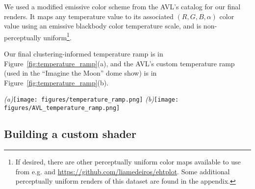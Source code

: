 \documentclass[fleqn,usenatbib,useAMS]{mnras}
\begin{document}
We used a modified emissive color scheme from the AVL's catalog for our final renders. It maps any temperature value to its associated $(R,G,B, \alpha)$ color value using an emissive blackbody color temperature scale, and is non-perceptually uniform\footnote{If desired, there are other perceptually uniform color maps available to use from e.g. \cite{Moreland16} and \url{https://github.com/liamedeiros/ehtplot}. Some additional perceptually uniform renders of this dataset are found in the appendix.}. \par

Our final clustering-informed temperature ramp is in Figure~\ref{fig:temperature_ramp}(a), and the AVL's custom temperature ramp (used in the ``Imagine the Moon'' dome show) is in Figure~\ref{fig:temperature_ramp}(b). \par
%
\begin{figure*}
 \begin{minipage}[c]{1.0\linewidth}
  \centering
  \begin{center}
  \textit{(a)}\texttt{[image: figures/temperature\_ramp.png]}
  \textit{(b)}\texttt{[image: figures/AVL\_temperature\_ramp.png]}
  \caption{\textit{(a)}: The non-uniform, emissive colormap with markers and associated $(R,G,B)$ values informed by the 5-cluster GMM result. The colormap is over temperatures [0 K, 14308 K] to match that of the AVL rendering for later comparison, despite the dataset temperatures ranging from [2453 K, 14308 K] (the range [0 K, 14308 K] was chosen for aesthetic reasons). Here, the hottest temperatures map to light blue, moderate temperatures map to orange, and the coolest temperatures map to dark red/brown. \textit{(b)}: The custom AVL colormap, from [0 K, 14308 K], used in the ``Imagine the Moon'' dome show. Ten key points are used with a B-Spline interpolation, and are roughly equally spaced over the length of the colormap. Here the hottest temperatures map to mostly light yellow/white tones instead of a light blue like in the \texttt{Estra}-generated colormap.}
  \label{fig:temperature_ramp}
  \end{center}
  \end{minipage}
\end{figure*}
%


\subsection{Building a custom shader}
\end{document}
